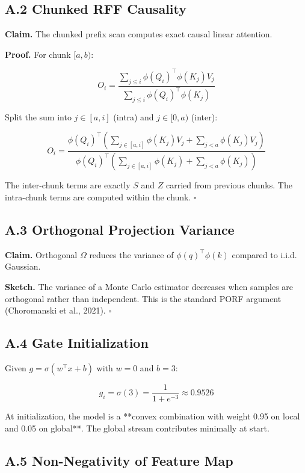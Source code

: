 \subsection{A.2 Chunked RFF Causality}

\textbf{Claim.} The chunked prefix scan computes exact causal linear attention.

\textbf{Proof.} For chunk $[a, b)$:

\[
O_i = \frac{\sum_{j \le i} \phi(Q_i)^\top \phi(K_j) V_j}{\sum_{j \le i} \phi(Q_i)^\top \phi(K_j)}
\tag{A.1}
\]

Split the sum into $j \in [a, i]$ (intra) and $j \in [0, a)$ (inter):

\[
O_i = \frac{\phi(Q_i)^\top \left(\sum_{j \in [a, i]} \phi(K_j) V_j + \sum_{j < a} \phi(K_j) V_j\right)}{\phi(Q_i)^\top \left(\sum_{j \in [a, i]} \phi(K_j) + \sum_{j < a} \phi(K_j)\right)}
\tag{A.2}
\]

The inter-chunk terms are exactly $S$ and $Z$ carried from previous chunks. 
The intra-chunk terms are computed within the chunk. $\square$

\subsection{A.3 Orthogonal Projection Variance}

\textbf{Claim.} Orthogonal $\Omega$ reduces the variance of $\phi(q)^\top \phi(k)$ 
compared to i.i.d. Gaussian.

\textbf{Sketch.} The variance of a Monte Carlo estimator decreases when samples 
are orthogonal rather than independent. This is the standard PORF argument 
(Choromanski et al., 2021). $\square$

\subsection{A.4 Gate Initialization}

Given $g = \sigma(w^\top x + b)$ with $w = 0$ and $b = 3$:

\[
g_i = \sigma(3) = \frac{1}{1 + e^{-3}} \approx 0.9526
\tag{A.3}
\]

At initialization, the model is a **convex combination with weight 0.95 on 
local and 0.05 on global**. The global stream contributes minimally at start.

\subsection{A.5 Non-Negativity of Feature Map}

